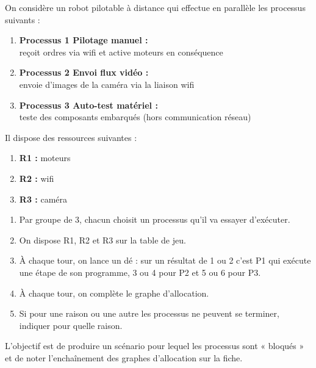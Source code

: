 \documentclass[a4paper,12pt,french]{book}
\begin{document}
\begin{exercice}
On considère un robot pilotable à distance qui effectue en parallèle les processus suivants :
\begin{enumerate}[--]
	\item 	\textbf{Processus 1  Pilotage manuel : }\\ reçoit ordres via wifi et active moteurs en conséquence
	\item 	\textbf{Processus 2  Envoi flux vidéo : }\\ envoie d'images de la caméra via la liaison wifi
    \item 	\textbf{Processus 3  Auto-test matériel : }\\ teste des composants embarqués (hors communication réseau)
\end{enumerate}
Il dispose des ressources suivantes :
\begin{enumerate}[--]
	\item 	\textbf{R1 : }  moteurs
	\item 	\textbf{R2 : }  wifi
    \item 	\textbf{R3 : }	caméra
\end{enumerate}

\begin{enumerate}[\bfseries a.]
	\item Par groupe de 3, chacun choisit un processus qu'il va essayer d'exécuter.
	\item On dispose R1, R2 et R3 sur la table de jeu.
	\item À chaque tour, on lance un dé : sur un résultat de 1 ou 2 c'est P1 qui exécute une étape de son programme, 3 ou 4 pour P2 et 5 ou 6 pour P3.\\
	\item À chaque tour, on complète le graphe d'allocation.
	\item  Si pour une raison ou une autre les processus ne peuvent se terminer, indiquer pour quelle raison.
\end{enumerate}

L'objectif est de produire un scénario pour lequel les processus sont « bloqués » et de noter l'enchaînement des graphes d'allocation sur la fiche.

\end{exercice}
\end{document}

